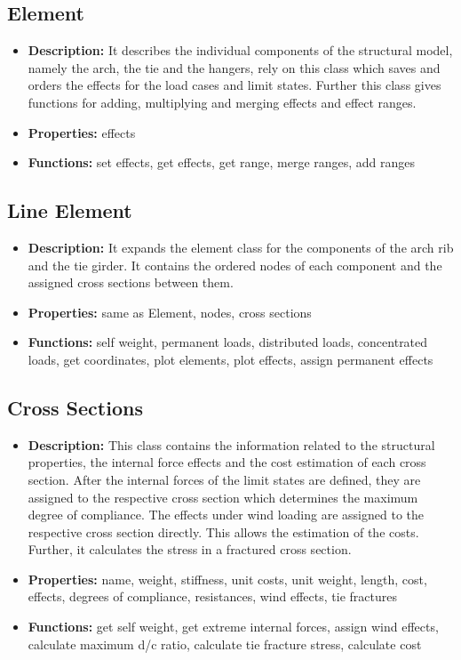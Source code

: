 \subsection*{Element}
\begin{itemize}
    \item {\bf Description:}  It describes the individual components of the structural model, namely the arch, the tie and the hangers, rely on this class which saves and orders the effects for the load cases and limit states. Further this class gives functions for adding, multiplying and merging effects and effect ranges.
    \item {\bf Properties:} effects
    \item {\bf Functions:} set effects, get effects, get range, merge ranges, add ranges
\end{itemize}

\subsection*{Line Element}
\begin{itemize}
    \item {\bf Description:} It expands the element class for the components of the arch rib and the tie girder. It contains the ordered nodes of each component and the assigned cross sections between them. 
    \item {\bf Properties:} same as Element, nodes, cross sections
    \item {\bf Functions:} self weight, permanent loads, distributed loads, concentrated loads, get coordinates, plot elements, plot effects, assign permanent effects
\end{itemize}

\subsection*{Cross Sections}
\begin{itemize}
    \item {\bf Description:} This class contains the information related to the structural properties, the internal force effects and the cost estimation of each cross section. After the internal forces of the limit states are defined, they are assigned to the respective cross section which determines the maximum degree of compliance. The effects under wind loading are assigned to the respective cross section directly. This allows the estimation of the costs. Further, it calculates the stress in a fractured cross section.
    \item {\bf Properties:} name, weight, stiffness, unit costs, unit weight, length, cost, effects, degrees of compliance, resistances, wind effects, tie fractures
    \item {\bf Functions:} get self weight, get extreme internal forces, assign wind effects, calculate maximum d/c ratio, calculate tie fracture stress, calculate cost
\end{itemize}

